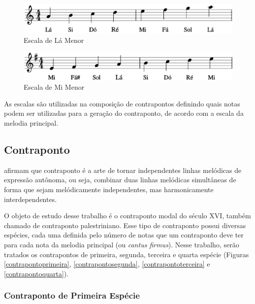         \begin{figure}[htb]
          \centering
          \includegraphics[scale=0.6]{figuras/escalalamenor.eps}
          \caption{Escala de Lá Menor}
          \label{escalalamenor}
        \end{figure}

        \begin{figure}[htb]
          \centering
          \includegraphics[scale=0.45]{figuras/escalamimenor.eps}
          \caption{Escala de Mi Menor}
          \label{escalamimenor}
        \end{figure}

        As escalas são utilizadas na composição de contrapontos definindo quais notas podem ser utilizadas para a geração do contraponto, de acordo com a escala da melodia principal.

    \subsection[Contraponto]{Contraponto}

       afirmam que contraponto é a arte de tornar independentes linhas melódicas de expressão autônoma, ou seja, combinar duas linhas melódicas simultâneas de forma que sejam melódicamente independentes, mas harmonicamente interdependentes.

      O objeto de estudo desse trabalho é o contraponto modal do século XVI, também chamado de contraponto palestriniano. Esse tipo de contraponto possui diversas espécies, cada uma definida pelo número de notas que um contraponto deve ter para cada nota da melodia principal (ou \textit{cantus firmus}). Nesse trabalho, serão tratados os contrapontos de primeira, segunda, terceira e quarta espécie (Figuras \ref{contrapontoprimeira}, \ref{contrapontosegunda},  \ref{contrapontoterceira} e  \ref{contrapontoquarta}).

      \subsubsection[Contraponto de Primeira Espécie]{Contraponto de Primeira Espécie}

